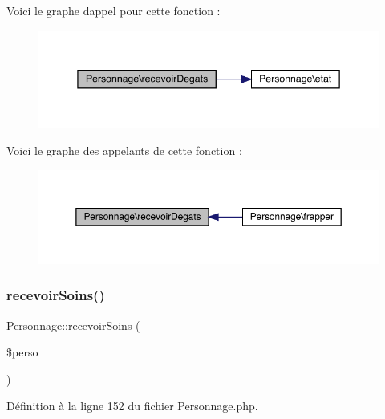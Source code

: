 Voici le graphe d\textquotesingle{}appel pour cette fonction \+:\nopagebreak
\begin{figure}[H]
\begin{center}
\leavevmode
\includegraphics[width=345pt]{class_personnage_a226affce78dca0151e0901896e58f14d_cgraph}
\end{center}
\end{figure}
Voici le graphe des appelants de cette fonction \+:\nopagebreak
\begin{figure}[H]
\begin{center}
\leavevmode
\includegraphics[width=350pt]{class_personnage_a226affce78dca0151e0901896e58f14d_icgraph}
\end{center}
\end{figure}
\mbox{\label{class_personnage_acadb61228a3ebdf18318771f954e2ae0}} 
\subsubsection{\texorpdfstring{recevoir\+Soins()}{recevoirSoins()}}
{\footnotesize\ttfamily Personnage\+::recevoir\+Soins (\begin{DoxyParamCaption}\item[{}]{\$perso }\end{DoxyParamCaption})}



Définition à la ligne 152 du fichier Personnage.\+php.

\mbox{\label{class_personnage_aa64edf7d4c080193213b12643eb05a5d}} 

